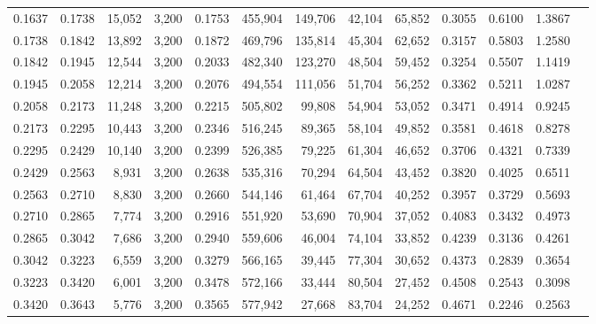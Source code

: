 \begin{tabular}{rrrrrrrrrrrrr}
0.1637 & 0.1738 & 15,052 & 3,200 &                                     0.1753 & 455,904 & 149,706 &  42,104 &  65,852 & 0.3055 & 0.6100 & 1.3867 \\
0.1738 & 0.1842 & 13,892 & 3,200 &                                     0.1872 & 469,796 & 135,814 &  45,304 &  62,652 & 0.3157 & 0.5803 & 1.2580 \\
0.1842 & 0.1945 & 12,544 & 3,200 &                                     0.2033 & 482,340 & 123,270 &  48,504 &  59,452 & 0.3254 & 0.5507 & 1.1419 \\
0.1945 & 0.2058 & 12,214 & 3,200 &                                     0.2076 & 494,554 & 111,056 &  51,704 &  56,252 & 0.3362 & 0.5211 & 1.0287 \\
0.2058 & 0.2173 & 11,248 & 3,200 &                                     0.2215 & 505,802 &  99,808 &  54,904 &  53,052 & 0.3471 & 0.4914 & 0.9245 \\
0.2173 & 0.2295 & 10,443 & 3,200 &                                     0.2346 & 516,245 &  89,365 &  58,104 &  49,852 & 0.3581 & 0.4618 & 0.8278 \\
0.2295 & 0.2429 & 10,140 & 3,200 &                                     0.2399 & 526,385 &  79,225 &  61,304 &  46,652 & 0.3706 & 0.4321 & 0.7339 \\
0.2429 & 0.2563 &  8,931 & 3,200 &                                     0.2638 & 535,316 &  70,294 &  64,504 &  43,452 & 0.3820 & 0.4025 & 0.6511 \\
0.2563 & 0.2710 &  8,830 & 3,200 &                                     0.2660 & 544,146 &  61,464 &  67,704 &  40,252 & 0.3957 & 0.3729 & 0.5693 \\
0.2710 & 0.2865 &  7,774 & 3,200 &                                     0.2916 & 551,920 &  53,690 &  70,904 &  37,052 & 0.4083 & 0.3432 & 0.4973 \\
0.2865 & 0.3042 &  7,686 & 3,200 &                                     0.2940 & 559,606 &  46,004 &  74,104 &  33,852 & 0.4239 & 0.3136 & 0.4261 \\
0.3042 & 0.3223 &  6,559 & 3,200 &                                     0.3279 & 566,165 &  39,445 &  77,304 &  30,652 & 0.4373 & 0.2839 & 0.3654 \\
0.3223 & 0.3420 &  6,001 & 3,200 &                                     0.3478 & 572,166 &  33,444 &  80,504 &  27,452 & 0.4508 & 0.2543 & 0.3098 \\
0.3420 & 0.3643 &  5,776 & 3,200 &                                     0.3565 & 577,942 &  27,668 &  83,704 &  24,252 & 0.4671 & 0.2246 & 0.2563 \\

\end{tabular}
